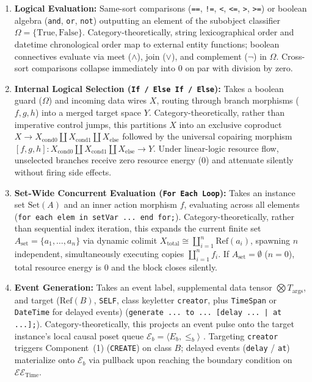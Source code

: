 \documentclass[11pt,a4paper]{article}
\theoremstyle{definition}
\theoremstyle{plain}
\theoremstyle{remark}
\begin{document}
\begin{enumerate}[label=\textbf{(\arabic*)}, leftmargin=*]
    \item \textbf{Logical Evaluation:}
    Same-sort comparisons (\texttt{==}, \texttt{!=}, \texttt{<}, \texttt{<=}, \texttt{>}, \texttt{>=}) or boolean algebra (\texttt{and}, \texttt{or}, \texttt{not}) outputting an element of the subobject classifier $\Omega = \{\mathrm{True}, \mathrm{False}\}$.
    Category-theoretically, string lexicographical order and datetime chronological order map to external entity functions; boolean connectives evaluate via meet ($\wedge$), join ($\vee$), and complement ($\neg$) in $\Omega$. Cross-sort comparisons collapse immediately into $0$ on par with division by zero.

    \item \textbf{Internal Logical Selection (\texttt{If / Else If / Else}):}
    Takes a boolean guard ($\Omega$) and incoming data wires $X$, routing through branch morphisms ($f, g, h$) into a merged target space $Y$.
    Category-theoretically, rather than imperative control jumps, this partitions $X$ into an exclusive coproduct $X \to X_{\mathrm{cond0}} \amalg X_{\mathrm{cond1}} \amalg X_{\mathrm{else}}$ followed by the universal copairing morphism $[f, g, h] : X_{\mathrm{cond0}} \amalg X_{\mathrm{cond1}} \amalg X_{\mathrm{else}} \to Y$. Under linear-logic resource flow, unselected branches receive zero resource energy ($0$) and attenuate silently without firing side effects.

    \item \textbf{Set-Wide Concurrent Evaluation (\texttt{For Each Loop}):}
    Takes an instance set $\mathrm{Set}(A)$ and an inner action morphism $f$, evaluating across all elements (\texttt{for each elem in setVar ... end for;}).
    Category-theoretically, rather than sequential index iteration, this expands the current finite set $A_{\mathrm{set}} = \{a_1, \dots, a_n\}$ via dynamic colimit $X_{\mathrm{total}} \cong \coprod_{i=1}^n \mathrm{Ref}(a_i)$, spawning $n$ independent, simultaneously executing copies $\coprod_{i=1}^n f_i$. If $A_{\mathrm{set}} = \emptyset$ ($n=0$), total resource energy is $0$ and the block closes silently.

    \item \textbf{Event Generation:}
    Takes an event label, supplemental data tensor $\bigotimes T_{\mathrm{args}}$, and target ($\mathrm{Ref}(B)$, \texttt{SELF}, class keyletter \texttt{creator}, plus \texttt{TimeSpan} or \texttt{DateTime} for delayed events) (\texttt{generate ... to ... [delay ... | at ...];}).
    Category-theoretically, this projects an event pulse onto the target instance's local causal poset queue $\mathcal{E}_b = \langle E_b, \le_b \rangle$ \cite{milner1989}. Targeting \texttt{creator} triggers Component~(1) (\texttt{CREATE}) on class $B$; delayed events (\texttt{delay} / \texttt{at}) materialize onto $\mathcal{E}_b$ via pullback upon reaching the boundary condition on $\mathcal{EE}_{\mathrm{Time}}$.


\end{enumerate}
\end{document}
